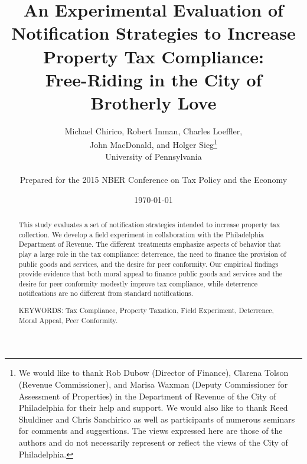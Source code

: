 \documentclass[12pt,titlepage]{article}
\renewcommand{\thefootnote}{\fnsymbol{footnote}}
\begin{document}
\title{An Experimental Evaluation of Notification Strategies to
  Increase Property Tax Compliance: \\ Free-Riding in the City of
  Brotherly Love} \author{Michael Chirico, Robert Inman, Charles
  Loeffler, \\ John MacDonald, and Holger Sieg\thanks{We would like to
    thank Rob Dubow (Director of Finance), Clarena Tolson (Revenue
    Commissioner), and Marisa Waxman (Deputy Commissioner for
    Assessment of Properties) in the Department of Revenue of the City
    of Philadelphia for their help and support. We would also like to
    thank Reed Shuldiner and Chris Sanchirico as well as participants
    of numerous seminars for comments and suggestions. The views
    expressed here are those of the authors and do not necessarily
    represent or reflect the views of the City of Philadelphia.}
  \\ University of Pennsylvania \\ \\ Prepared for the 2015 NBER
  Conference on Tax Policy and the Economy} \date{\today}

\maketitle

\begin{abstract}

This study evaluates a set of notification strategies intended to
increase property tax collection. We develop a field experiment in
collaboration with the Philadelphia Department of Revenue.  The
different treatments emphasize aspects of behavior that play a large
role in the tax compliance: deterrence, the need to finance the
provision of public goods and services, and the desire for peer
conformity. Our empirical findings provide evidence that both moral
appeal to finance public goods and services and the desire for peer
conformity modestly improve tax compliance, while deterrence
notifications are no different from standard notifications.

\noindent KEYWORDS: Tax Compliance, Property Taxation, Field
Experiment, Deterrence, Moral Appeal, Peer Conformity.

\end{abstract}

\newpage

\renewcommand{\thefootnote}{\arabic{footnote}}

\renewcommand{\thefootnote}{\arabic{footnote}}
\end{document}
